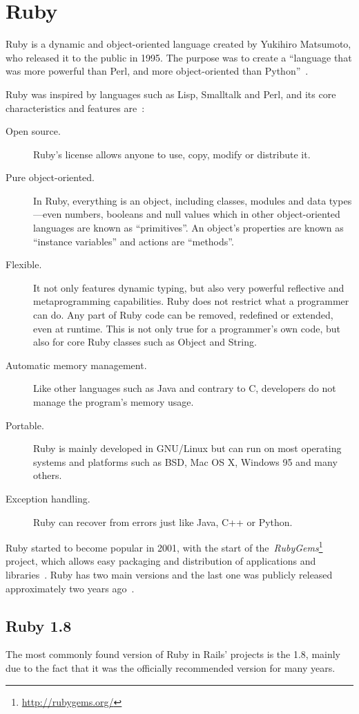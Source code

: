 \section{Ruby} %
\label{tech:sec:ruby}
Ruby is a dynamic and object-oriented language created by Yukihiro Matsumoto, who released it to the public in 1995. The purpose was to create a ``language that was more powerful than Perl, and more object-oriented than Python''~\cite{interview_creator_ruby}.

Ruby was inspired by languages such as Lisp, Smalltalk and Perl, and its core characteristics and features are~\cite{ruby_about, ruby_book}:
\begin{description}
  \item[Open source.] Ruby's license allows anyone to use, copy, modify or distribute it.
  \item[Pure object-oriented.] In Ruby, everything is an object, including classes, modules and data types---even numbers, booleans and null values which in other object-oriented languages are known as ``primitives''. An object's properties are known as ``instance variables'' and actions are ``methods''.
  \item[Flexible.] It not only features dynamic typing, but also very powerful reflective and metaprogramming capabilities. Ruby does not restrict what a programmer can do. Any part of Ruby code can be removed, redefined or extended, even at runtime. This is not only true for a programmer's own code, but also for core Ruby classes such as Object and String.
  \item[Automatic memory management.] Like other languages such as Java and contrary to C, developers do not manage the program's memory usage.
  \item[Portable.] Ruby is mainly developed in GNU/Linux but can run on most operating systems and platforms such as BSD, Mac OS X, Windows 95 and many others.
  \item[Exception handling.] Ruby can recover from errors just like Java, C++ or Python.
\end{description}
Ruby started to become popular in 2001, with the start of the~\textit{RubyGems}\footnote{\url{http://rubygems.org/}} project, which allows easy packaging and distribution of applications and libraries~\cite{railssolutions}. Ruby has two main versions and the last one was publicly released approximately two years ago~\cite{ruby191_release}.


\subsection{Ruby 1.8}
The most commonly found version of Ruby in Rails' projects is the 1.8, mainly due to the fact that it was the officially recommended version for many years.

